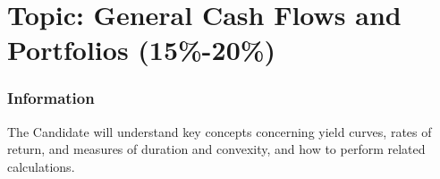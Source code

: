 \chapter[Topic: General Cash Flows and Portfolios]{Topic: General Cash Flows and Portfolios (15\%-20\%)}

\subsection{Information}

\begin{distributions}[Objective]
The Candidate will understand key concepts concerning yield curves, rates of return, and measures of duration and convexity, and how to perform related calculations.
\end{distributions}

